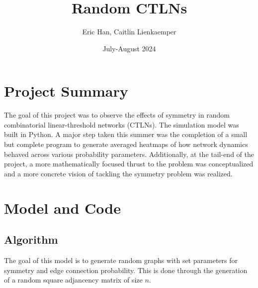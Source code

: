 \documentclass{article}
\title{Random CTLNs}
\author{Eric Han, Caitlin Lienkaemper}
\date{July-August 2024}
\begin{document}
\maketitle

\section{Project Summary}
The goal of this project was to observe the effects of symmetry in random combinatorial linear-threshold networks (CTLNs). The simulation model was built in Python. A major step taken this summer was the completion of a small but complete program to generate averaged heatmaps of how network dynamics behaved across various probability parameters. Additionally, at the tail-end of the project, a more mathematically focused thrust to the problem was conceptualized and a more concrete vision of tackling the symmetry problem was realized.

\section{Model and Code}
\subsection{Algorithm}
The goal of this model is to generate random graphs with set parameters for symmetry and edge connection probability. This is done through the generation of a random square adjancency matrix of size $n$.
\end{document}
